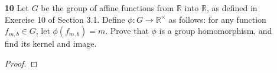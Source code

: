 \documentclass[paper=usletter, fontsize=12pt]{article}
\begin{document}
\begin{itemize}
\begin{enumerate}
\begin{enumerate}
\begin{proof}
                    For $\phi$ to be homomorphic, the identity element of $\gl_2(\mathbb{R})=e_1=\left[\begin{tabular}{cc}
                            1 & 0 \\
                            0 & 1
                    \end{tabular}\right]$ must be mapped to the identity element of $\mathbb{R}^{\times}=e_2=1$\\
                    But
                    \begin{align*}
                        \phi\left(\left[\begin{tabular}{cc}
                            1 & 0 \\
                            0 & 1
                        \end{tabular}\right]\right) &= 1 \times 0\\
                        &= 0 \\
                        & \neq e_2=1
                    \end{align*}
                    Therefore, $\phi$ is not a homomorphism \qedhere

                \end{proof}

            \end{enumerate}

            \item[\textbf{10}] Let $G$ be the group of affine functions from
            $\mathbb{R}$ into $\mathbb{R}$, as defined in Exercise 10 of
            Section 3.1. Define $\phi:G \rightarrow \mathbb{R}^{\times}$ as
            follows: for any function $f_{m,b} \in G$, let $\phi(f_{m,b})=m$.
            Prove that $\phi$ is a group homomorphism, and find its kernel and
            image.
            \begin{proof}


\end{proof}
\end{enumerate}
\end{itemize}
\end{document}

